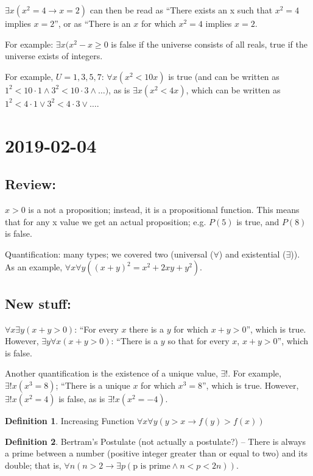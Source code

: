 \documentclass{article}
\theoremstyle{definition}
\newtheorem{definition}{Definition}[section]
\begin{document}
$\exists x (x^2=4 \rightarrow x=2)$ can then be read as ``There exists an x
such that $x^2=4$ implies $x=2$'', or as ``There is an $x$ for which $x^2=4$
implies $x=2$.

For example: $\exists x (x^2-x \geq 0$ is false if the universe consists of all reals, true if the universe exists of integers. 

For example, $U={1,3,5,7}$: $\forall x (x^2 < 10x)$ is true (and can be written
as $1^2 < 10 \cdot 1 \land 3^2 < 10 \cdot 3 \land \ldots)$, as is
$\exists x (x^2<4x)$, which can be written as $1^2 < 4 \cdot 1 \lor 3^2 < 4 \cdot
3 \lor \ldots$. 
 
\section*{2019-02-04}
\subsection*{Review:}
$x > 0$ is a not a proposition; instead, it is a propositional function. This
means that for any x value we get an actual proposition; e.g. $P(5)$ is true,
and $P(8)$ is false.

Quantification: many types; we covered two (universal ($\forall$) and
existential ($\exists$)). As an example, $\forall x \forall y ((x+y)^2 = x^2 + 2xy + y^2)$.

\subsection*{New stuff:}

$\forall x \exists y (x+y > 0)$: ``For every $x$ there is a $y$ for which $x+y>0$'', which is true. However, $\exists y \forall x (x+y>0)$: ``There is a $y$ so that for every $x$, $x+y > 0$'', which is false.

Another quantification is the existence of a unique value, $\exists!$. For example, $\exists! x (x^3=8)$; ``There is a unique $x$ for which $x^3=8$'', which is true. However, $\exists! x ( x^2 = 4 )$ is false, as is $\exists! x ( x^2 = -4 )$.

\begin{definition}{Increasing Function}
  $\forall x \forall y ( y > x \rightarrow f(y) > f(x))$
\end{definition}

\begin{definition}{Bertram's Postulate}
  (not actually a postulate?) -- There is always a prime between a number 
  (positive integer greater than or equal to two)  and its double; that is,
  $\forall n (n>2 \rightarrow \exists p (\text{p is prime} \land n<p<2n))$.
\end{definition}
\end{document}
